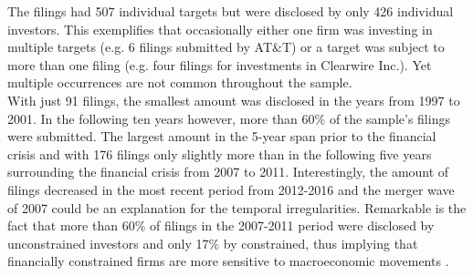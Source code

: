 \documentclass[12pt]{article}
\begin{document}
The filings had 507 individual targets but were disclosed by only 426 individual investors. This exemplifies that occasionally either one firm was investing in multiple targets (e.g. 6 filings submitted by AT\&T) or a target was subject to more than one filing (e.g. four filings for investments in Clearwire Inc.). Yet multiple occurrences are not common throughout the sample.\\
With just 91 filings, the smallest amount was disclosed in the years from 1997 to 2001. In the following ten years however, more than 60\% of the sample's filings were submitted. The largest amount in the 5-year span prior to the financial crisis and with 176 filings only slightly more than in the following five years surrounding the financial crisis from 2007 to 2011. Interestingly, the amount of filings decreased in the most recent period from 2012-2016 and the merger wave of 2007 \citep[p.19]{Huang2017} could be an explanation for the temporal irregularities. Remarkable is the fact that more than 60\% of filings in the 2007-2011 period were disclosed by unconstrained investors and only 17\% by constrained, thus implying that financially constrained firms are more sensitive to macroeconomic movements \citep[p.1197]{Campello2006}.
\end{document}
